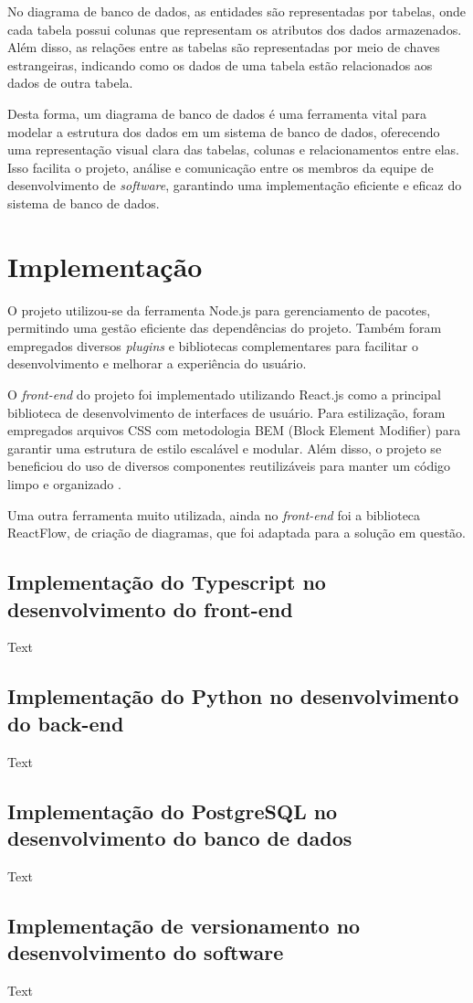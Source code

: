No diagrama de banco de dados, as entidades são representadas por tabelas, onde cada tabela possui colunas que representam os atributos dos dados armazenados. Além disso, as relações entre as tabelas são representadas por meio de chaves estrangeiras, indicando como os dados de uma tabela estão relacionados aos dados de outra tabela.
            
Desta forma, um diagrama de banco de dados é uma ferramenta vital para modelar a estrutura dos dados em um sistema de banco de dados, oferecendo uma representação visual clara das tabelas, colunas e relacionamentos entre elas. Isso facilita o projeto, análise e comunicação entre os membros da equipe de desenvolvimento de \textit{software}, garantindo uma implementação eficiente e eficaz do sistema de banco de dados.
    
\section{Implementação}

O projeto utilizou-se da ferramenta Node.js para gerenciamento de pacotes, permitindo uma gestão eficiente das dependências do projeto. Também foram empregados diversos \textit{plugins} e bibliotecas complementares para facilitar o desenvolvimento e melhorar a experiência do usuário.

O \textit{front-end} do projeto foi implementado utilizando React.js como a principal biblioteca de desenvolvimento de interfaces de usuário. Para estilização, foram empregados arquivos CSS com metodologia BEM (Block Element Modifier) para garantir uma estrutura de estilo escalável e modular. Além disso, o projeto se beneficiou do uso de diversos componentes reutilizáveis para manter um código limpo e organizado \cite{eloquentjavascript}.

Uma outra ferramenta muito utilizada, ainda no \textit{front-end} foi a biblioteca ReactFlow, de criação de diagramas, que foi adaptada para a solução em questão.

\subsection{Implementação do Typescript no desenvolvimento do front-end}
Text

\subsection{Implementação do Python no desenvolvimento do back-end}
Text
    
\subsection{Implementação do PostgreSQL no desenvolvimento do banco de dados}
Text

    
\subsection{Implementação de versionamento no desenvolvimento do software}
Text
    
